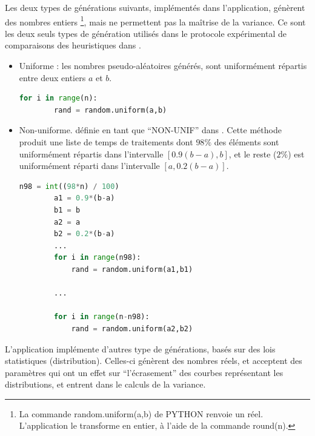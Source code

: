 \documentclass[a4paper,12pt]{report}
\theoremstyle{plain}				%
\theoremstyle{definition}				%
\begin{document}
\begin{appendices}
\bigskip
Les deux types de générations suivants, implémentés dans l'application, 
  génèrent des nombres entiers \footnote{\samepage La commande random.uniform(a,b) de PYTHON renvoie un réel. L'application le transforme en entier, à l'aide de la commande round(n).}, mais ne permettent pas la maîtrise de la variance. 
Ce sont les deux seuls types de génération utilisés dans le protocole expérimental de comparaisons des heuristiques dans \cite{della2020longest}.
   
\begin{itemize}
\item Uniforme : les nombres pseudo-aléatoires générés, sont uniformément répartis 
  entre deux entiers $a$ et $b$.
   
  \begin{lstlisting}[language=Python]
	for i in range(n):
		rand = random.uniform(a,b)
  \end{lstlisting}

\item Non-uniforme. définie en tant que ``NON-UNIF'' dans \cite{frangioni2000multi}. Cette méthode produit 
  une liste de temps de traitements dont 
  $98\%$ des éléments sont uniformément répartis dans l’intervalle  $[0.9 (b-a), b]$, et 
  le reste ($2\%$) est uniformément réparti dans l'intervalle  $[a, 0.2 (b-a)]$.


  \begin{lstlisting}[language=Python]
	n98 = int((98*n) / 100)
	    a1 = 0.9*(b-a)
    	b1 = b
    	a2 = a
    	b2 = 0.2*(b-a)
		...
    	for i in range(n98):
       		rand = random.uniform(a1,b1)

    	...
    
    	for i in range(n-n98):
    		rand = random.uniform(a2,b2)
  \end{lstlisting}
  
\end{itemize}

\bigskip
L'application implémente d'autres type de générations, basés sur des lois statistiques (distribution). 
Celles-ci génèrent des nombres réels, et acceptent des paramètres qui ont un effet sur 
  ``l'écrasement'' des courbes représentant les distributions, 
  et entrent dans le calculs de la variance.


\end{appendices}
\end{document}
